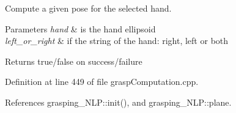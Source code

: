Compute a given pose for the selected hand. 


\begin{DoxyParams}{Parameters}
{\em hand} & is the hand ellipsoid \\
\hline
{\em left\+\_\+or\+\_\+right} & if the string of the hand\+: right, left or both \\
\hline
\end{DoxyParams}
\begin{DoxyReturn}{Returns}
true/false on success/failure 
\end{DoxyReturn}


Definition at line 449 of file grasp\+Computation.\+cpp.



References grasping\+\_\+\+N\+L\+P\+::init(), and grasping\+\_\+\+N\+L\+P\+::plane.


